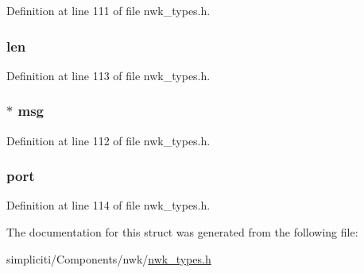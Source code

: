 \-Definition at line 111 of file nwk\-\_\-types.\-h.

\hypertarget{structioctlRawSend__t_a5723e60ffd628510c699eddbce90be23}{
\subsubsection[{len}]{ {\bf len}}}\label{structioctlRawSend__t_a5723e60ffd628510c699eddbce90be23}


\-Definition at line 113 of file nwk\-\_\-types.\-h.

\hypertarget{structioctlRawSend__t_a8dd37bf01473e324d7c15a19fd211de9}{
\subsubsection[{msg}]{$\ast$ {\bf msg}}}\label{structioctlRawSend__t_a8dd37bf01473e324d7c15a19fd211de9}


\-Definition at line 112 of file nwk\-\_\-types.\-h.

\hypertarget{structioctlRawSend__t_a2fa54f9024782843172506fadbee2ac8}{
\subsubsection[{port}]{ {\bf port}}}\label{structioctlRawSend__t_a2fa54f9024782843172506fadbee2ac8}


\-Definition at line 114 of file nwk\-\_\-types.\-h.



\-The documentation for this struct was generated from the following file\-:\begin{DoxyCompactItemize}
\item 
simpliciti/\-Components/nwk/\hyperlink{nwk__types_8h}{nwk\-\_\-types.\-h}\end{DoxyCompactItemize}
